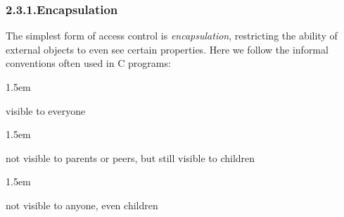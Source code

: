 \documentclass[preprint]{{sigplanconf}}
\begin{document}
\subsubsection{2.3.1.\hspace*{0.5em}Encapsulation}\label{sec-encapsulation}%

\noindent{}The simplest form of access control is \emph{encapsulation}, restricting the ability of
external objects to even see certain properties.  Here we follow the informal
conventions often used in C programs:%

\begin{mddefinitions}%


\begin{mdbmarginx}{}{}{}{1.5em}%
\begin{mddefdata}%
visible to everyone
\end{mddefdata}%
\end{mdbmarginx}%


\begin{mdbmarginx}{}{}{}{1.5em}%
\begin{mddefdata}%
not visible to parents or peers, but still visible to children
\end{mddefdata}%
\end{mdbmarginx}%


\begin{mdbmarginx}{}{}{}{1.5em}%
\begin{mddefdata}%
not visible to anyone, even children%
\end{mddefdata}%
\end{mdbmarginx}%
\end{mddefinitions}%
\end{document}
